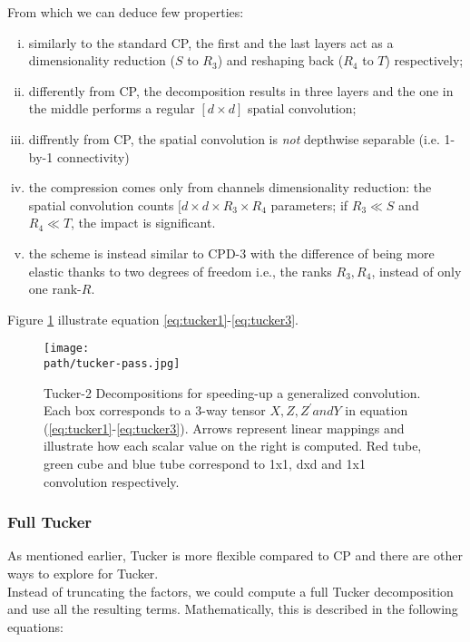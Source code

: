 From which we can deduce few properties: 
\begin{enumerate}[(i)]
	\item similarly to the standard CP, the first and the last layers act as a dimensionality reduction ($S $ to $R_3$) and reshaping back ($R_4$ to $T$) respectively; 
	
	\item differently from CP, the decomposition results in three layers and the one in the middle performs a regular $[d \times d]$ spatial convolution; 
	
	\item diffrently from CP, the spatial convolution is \emph{not} depthwise separable (i.e. 1-by-1 connectivity) 
	
	\item the compression comes only from channels dimensionality reduction: the spatial convolution counts $[d \times d \times R_3 \times R_4$ parameters; if $R_3 \ll S$ and $R_4 \ll T$, the impact is significant. 
	
	\item the scheme is instead similar to CPD-3 with the difference of being more elastic thanks to two degrees of freedom i.e., the ranks $R_3, R_4$, instead of only one rank-$R$.
\end{enumerate}

Figure \ref{fig:tucker-pass} illustrate equation \ref{eq:tucker1}-\ref{eq:tucker3}. 

\begin{figure}[h!]
 \centering
 \texttt{[image: \\path/tucker-pass.jpg]} 
 \caption[Tucker decomposition application on a CONV layer]{Tucker-2  Decompositions  for  speeding-up  a generalized convolution. Each box corresponds to a 3-way tensor $X, Z, Z^' and Y$ in equation (\ref{eq:tucker1}-\ref{eq:tucker3}). Arrows represent linear mappings and illustrate how each scalar value on the right is computed. Red tube, green cube and blue tube correspond to 1x1, dxd and 1x1 convolution respectively.}
 \label{fig:tucker-pass}
\end{figure}

\newpage 
\subsubsection{Full Tucker}
As mentioned earlier, Tucker is more flexible compared to CP and there are other ways to explore for Tucker. 
\\
Instead of truncating the factors, we could compute a full Tucker decomposition and use all the resulting terms. Mathematically, this is described in the following equations:  


